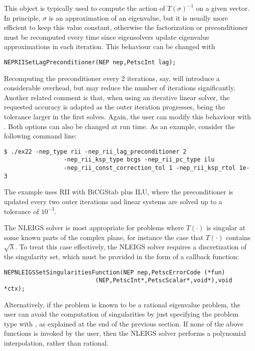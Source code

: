 This  object is typically used to compute the action of $T(\sigma)^{-1}$ on a given vector. In principle, $\sigma$ is an approximation of an eigenvalue, but it is usually more efficient to keep this value constant, otherwise the factorization or preconditioner must be recomputed every time since eigensolvers update eigenvalue approximations in each iteration. This behaviour can be changed with
	\begin{Verbatim}[fontsize=\small]
	NEPRIISetLagPreconditioner(NEP nep,PetscInt lag);
	\end{Verbatim}
Recomputing the preconditioner every 2 iterations, say, will introduce a considerable overhead, but may reduce the number of iterations significantly. Another related comment is that, when using an iterative linear solver, the requested accuracy is adapted as the outer iteration progresses, being the tolerance larger in the first solves. Again, the user can modify this behaviour with . Both options can also be changed at run time. As an example, consider the following command line:
\begin{Verbatim}[fontsize=\small]
	$ ./ex22 -nep_type rii -nep_rii_lag_preconditioner 2
                 -nep_rii_ksp_type bcgs -nep_rii_pc_type ilu
                 -nep_rii_const_correction_tol 1 -nep_rii_ksp_rtol 1e-3
\end{Verbatim}
The example uses RII with BiCGStab plus ILU, where the preconditioner is updated every two outer iterations and linear systems are solved up to a tolerance of $10^{-3}$.

The NLEIGS solver is most appropriate for problems where $T(\cdot)$ is singular at some known parts of the complex plane, for instance the case that $T(\cdot)$ contains $\sqrt{\lambda}$. To treat this case effectively, the NLEIGS solver requires a discretization of the singularity set, which must be provided in the form of a callback function:
	\begin{Verbatim}[fontsize=\small]
        NEPNLEIGSSetSingularitiesFunction(NEP nep,PetscErrorCode (*fun)
                          (NEP,PetscInt*,PetscScalar*,void*),void *ctx);
	\end{Verbatim}
Alternatively, if the problem is known to be a rational eigenvalue problem, the user can avoid the computation of singularities by just specifying the problem type with , as explained at the end of the previous section.
If none of the above functions is invoked by the user, then the NLEIGS solver performs a polynomial interpolation, rather than rational. 

